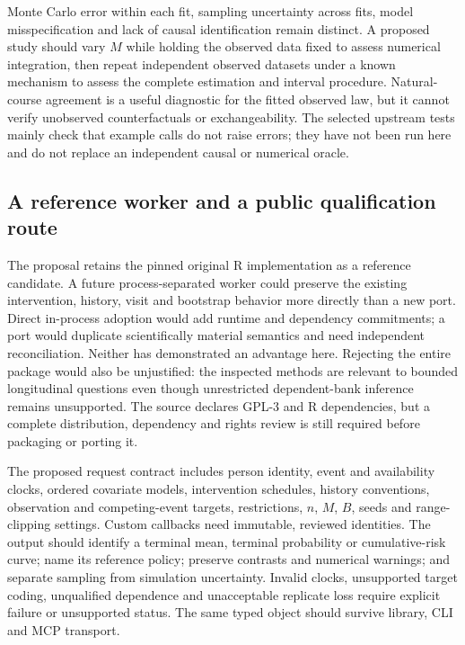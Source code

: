 Monte Carlo error within each fit, sampling uncertainty across fits, model misspecification and lack of causal identification remain distinct. A proposed study should vary $M$ while holding the observed data fixed to assess numerical integration, then repeat independent observed datasets under a known mechanism to assess the complete estimation and interval procedure. Natural-course agreement is a useful diagnostic for the fitted observed law, but it cannot verify unobserved counterfactuals or exchangeability. The selected upstream tests mainly check that example calls do not raise errors; they have not been run here and do not replace an independent causal or numerical oracle.~\citep{exec20_gformula_reuse}

\subsection{A reference worker and a public qualification route}
\label{exec20:gformula-reuse}
The proposal retains the pinned original R implementation as a reference candidate. A future process-separated worker could preserve the existing intervention, history, visit and bootstrap behavior more directly than a new port. Direct in-process adoption would add runtime and dependency commitments; a port would duplicate scientifically material semantics and need independent reconciliation. Neither has demonstrated an advantage here. Rejecting the entire package would also be unjustified: the inspected methods are relevant to bounded longitudinal questions even though unrestricted dependent-bank inference remains unsupported. The source declares GPL-3 and R dependencies, but a complete distribution, dependency and rights review is still required before packaging or porting it.~\citep{exec20_gformula_reuse}

The proposed request contract includes person identity, event and availability clocks, ordered covariate models, intervention schedules, history conventions, observation and competing-event targets, restrictions, $n$, $M$, $B$, seeds and range-clipping settings. Custom callbacks need immutable, reviewed identities. The output should identify a terminal mean, terminal probability or cumulative-risk curve; name its reference policy; preserve contrasts and numerical warnings; and separate sampling from simulation uncertainty. Invalid clocks, unsupported target coding, unqualified dependence and unacceptable replicate loss require explicit failure or unsupported status. The same typed object should survive library, CLI and MCP transport.

